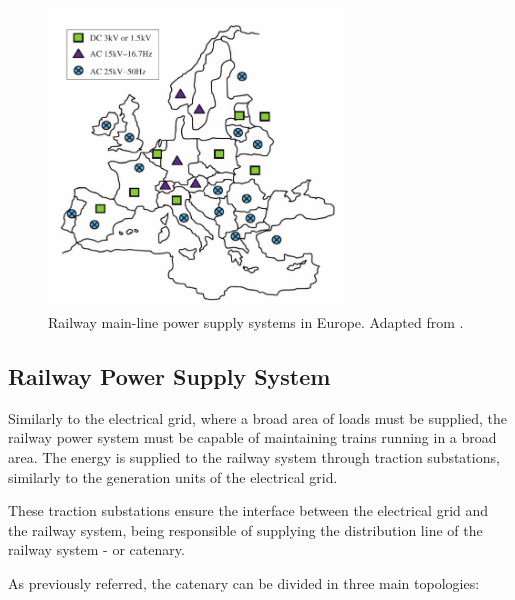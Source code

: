 \begin{figure}[h!]
	\centering
	\includegraphics[width=0.7\textwidth,keepaspectratio]{figures/31.PowerS/abad2016}
	\caption{Railway main-line power supply systems in Europe. Adapted from \cite{abad2016}.}
	\label{fig:abad2016}
\end{figure}



\subsection{Railway Power Supply System}
\label{subs:312}

Similarly to the electrical grid, where a broad area of loads must be supplied, the railway power system must be capable of maintaining trains running in a broad area. The energy is supplied to the railway system through traction substations, similarly to the generation units of the electrical grid.

These traction substations ensure the interface between the electrical grid and the railway system, being responsible of supplying the distribution line of the railway system - or catenary.

As previously referred, the catenary can be divided in three main topologies:

%	
%	
%	
%

